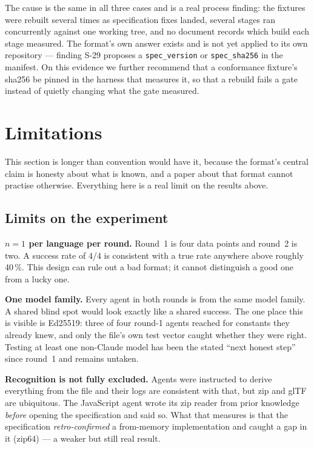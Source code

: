 \documentclass[10pt,twocolumn,letterpaper]{article}
\newcommand{\code}[1]{\texttt{\small #1}}
\begin{document}
The cause is the same in all three cases and is a real process finding: the
fixtures were rebuilt several times as specification fixes landed, several stages
ran concurrently against one working tree, and no document records which build
each stage measured. The format's own answer exists and is not yet applied to its
own repository --- finding S-29 proposes a \code{spec\_version} or
\code{spec\_sha256} in the manifest. On this evidence we further recommend that a
conformance fixture's sha256 be pinned in the harness that measures it, so that a
rebuild fails a gate instead of quietly changing what the gate measured.

\section{Limitations}
\label{sec:limits}

This section is longer than convention would have it, because the format's
central claim is honesty about what is known, and a paper about that format
cannot practise otherwise. Everything here is a real limit on the results above.

\subsection{Limits on the experiment}

\textbf{$n = 1$ per language per round.} Round~1 is four data points and round~2 is
two. A success rate of 4/4 is consistent with a true rate anywhere above roughly
40\,\%. This design can rule out a bad format; it cannot distinguish a good one
from a lucky one.

\textbf{One model family.} Every agent in both rounds is from the same model
family. A shared blind spot would look exactly like a shared success. The one
place this is visible is Ed25519: three of four round-1 agents reached for
constants they already knew, and only the file's own test vector caught whether
they were right. Testing at least one non-Claude model has been the stated ``next
honest step'' since round~1 and remains untaken.

\textbf{Recognition is not fully excluded.} Agents were instructed to derive
everything from the file and their logs are consistent with that, but zip and glTF
are ubiquitous. The JavaScript agent wrote its zip reader from prior knowledge
\emph{before} opening the specification and said so. What that measures is that
the specification \emph{retro-confirmed} a from-memory implementation and caught a
gap in it (zip64) --- a weaker but still real result.
\end{document}
